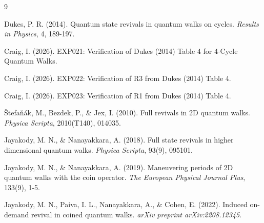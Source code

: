 \documentclass[12pt]{article}
\begin{document}


\begin{thebibliography}{9}

Dukes, P. R. (2014). Quantum state revivals in quantum walks on cycles. \textit{Results in Physics}, 4, 189-197.

Craig, I. (2026). EXP021: Verification of Dukes (2014) Table 4 for 4-Cycle Quantum Walks.

Craig, I. (2026). EXP022: Verification of R3 from Dukes (2014) Table 4.

Craig, I. (2026). EXP023: Verification of R1 from Dukes (2014) Table 4.

Štefaňák, M., Bezdek, P., \& Jex, I. (2010). Full revivals in 2D quantum walks. \textit{Physica Scripta}, 2010(T140), 014035.

Jayakody, M. N., \& Nanayakkara, A. (2018). Full state revivals in higher dimensional quantum walks. \textit{Physica Scripta}, 93(9), 095101.

Jayakody, M. N., \& Nanayakkara, A. (2019). Maneuvering periods of 2D quantum walks with the coin operator. \textit{The European Physical Journal Plus}, 133(9), 1-5.

Jayakody, M. N., Paiva, I. L., Nanayakkara, A., \& Cohen, E. (2022). Induced on-demand revival in coined quantum walks. \textit{arXiv preprint arXiv:2208.12345}.

\end{thebibliography}
\end{document}
